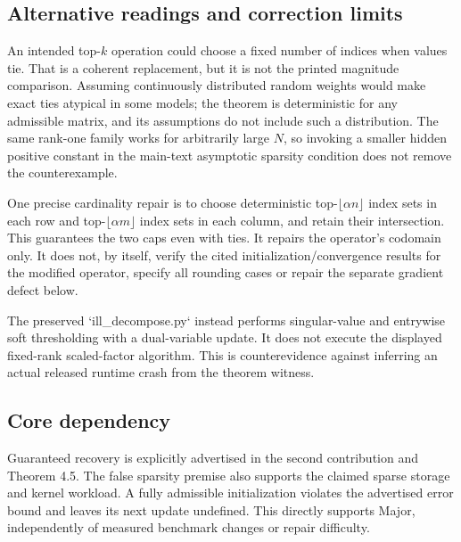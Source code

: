 \documentclass[10pt]{article}
\begin{document}
\subsection*{Alternative readings and correction limits}
An intended top-\(k\) operation could choose a fixed number of indices when values tie. That is a coherent replacement, but it is not the printed magnitude comparison. Assuming continuously distributed random weights would make exact ties atypical in some models; the theorem is deterministic for any admissible matrix, and its assumptions do not include such a distribution. The same rank-one family works for arbitrarily large \(N\), so invoking a smaller hidden positive constant in the main-text asymptotic sparsity condition does not remove the counterexample.\par
One precise cardinality repair is to choose deterministic top-\(\lfloor\alpha n\rfloor\) index sets in each row and top-\(\lfloor\alpha m\rfloor\) index sets in each column, and retain their intersection. This guarantees the two caps even with ties. It repairs the operator’s codomain only. It does not, by itself, verify the cited initialization/convergence results for the modified operator, specify all rounding cases or repair the separate gradient defect below.\par
The preserved `ill\_decompose.py` instead performs singular-value and entrywise soft thresholding with a dual-variable update. It does not execute the displayed fixed-rank scaled-factor algorithm. This is counterevidence against inferring an actual released runtime crash from the theorem witness.\par
\subsection*{Core dependency}
Guaranteed recovery is explicitly advertised in the second contribution and Theorem 4.5. The false sparsity premise also supports the claimed sparse storage and kernel workload. A fully admissible initialization violates the advertised error bound and leaves its next update undefined. This directly supports Major, independently of measured benchmark changes or repair difficulty.\par
\end{document}
